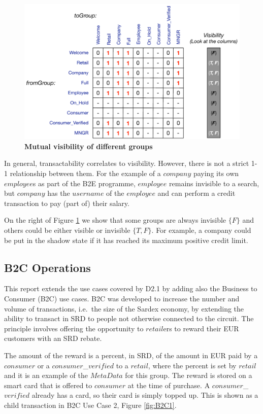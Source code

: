 \begin{figure}[H]
\centering
\includegraphics[width=12cm]{Figures/Visibility}
\caption{\small\textbf{Mutual visibility of different groups}}
\label{fig:visibility}
\vspace{-0.5cm}
\end{figure}

In general, transactability correlates to visibility. However, there is not a strict 1-1 relationship between them. For the example of a $company$ paying its own $employee$s as part of the B2E programme, $employee$ remains invisible to a search, but $company$ has the $username$ of the $employee$ and can perform a credit transaction to pay (part of) their salary.

On the right of Figure \ref{fig:visibility} we show that some groups are always invisible $\{ F \}$ and others could be either visible or invisible $\{T, F\}$. For example, a company could be put in the shadow state if it has reached its maximum positive credit limit.

\subsection{B2C Operations}
This report extends the use cases covered by D2.1 by adding also the Business to Consumer (B2C) use cases. B2C was developed to increase the number and volume of transactions, i.e.\ the size of the Sardex economy, by extending the ability to transact in SRD to people not otherwise connected to the circuit. The principle involves offering the opportunity to $retail$ers to reward their EUR customers with an SRD rebate.

The amount of the reward is a percent, in SRD, of the amount in EUR paid by a $consumer$ or a $consumer$\_$verified$ to a $retail$, where the percent is set by $retail$ and it is an example of the $MetaData$ for this group. The reward is stored on a smart card that is offered to $consumer$ at the time of purchase. A $consumer$\_$verified$ already has a card, so their card is simply topped up. This is shown as a child transaction in B2C Use Case 2, Figure \ref{fig:B2C1}.

